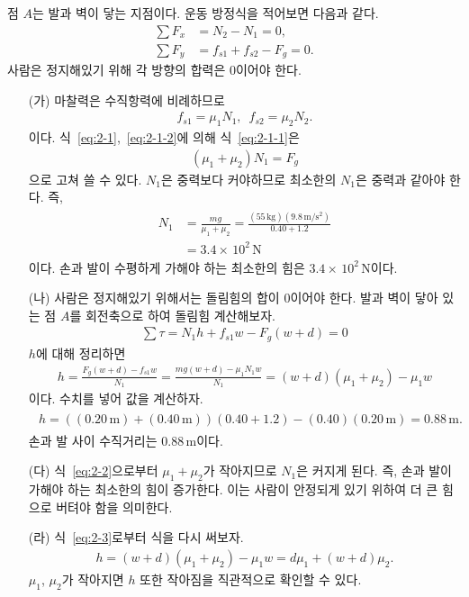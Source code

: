 \documentclass[floatfix,nofootinbib,superscriptaddress,fleqn]{revtex4-2}
\begin{document}
점 $A$는 발과 벽이 닿는 지점이다.
운동 방정식을 적어보면 다음과 같다.
\begin{align}
  \label{eq:2-1}\sum F_x &= N_{2}-N_{1} = 0,  \\
  \label{eq:2-1-1}\sum F_y &= f_{s1}+f_{s2}-F_g = 0.
\end{align}
사람은 정지해있기 위해 각 방향의 합력은 $0$이어야 한다.
\begin{itemize}
  \item[(가)] 마찰력은 수직항력에 비례하므로
  \begin{align}\label{eq:2-1-2}
    f_{s1} = \mu_1N_1,\,\,\,
    f_{s2} = \mu_2N_2.
  \end{align}
  이다. 식~\eqref{eq:2-1},~\eqref{eq:2-1-2}에 의해 
  식~\eqref{eq:2-1-1}은
  \begin{align}
    (\mu_1+\mu_2)N_1 =F_g
  \end{align}
  으로 고쳐 쓸 수 있다.
  $N_1$은 중력보다 커야하므로 최소한의 $N_1$은 중력과 같아야 한다. 즉,
  \begin{align}\label{eq:2-2}
    \begin{split}
      N_1 &= \frac{mg}{\mu_1+\mu_2}
      = \frac{(55\,\mathrm{kg})(9.8\,\mathrm{m/s^2})}{0.40+1.2} \\
      &= 3.4\times\,10^2\,\mathrm{N}
    \end{split}
  \end{align}
  이다. 손과 발이 수평하게 가해야 하는 최소한의 힘은 
  $3.4\times\,10^2\,\mathrm{N}$이다.
  \item[(나)] 
  사람은 정지해있기 위해서는 돌림힘의 합이 $0$이어야 한다. 
  발과 벽이 닿아 있는 점 $A$를 회전축으로 하여
  돌림힘 계산해보자.
  \begin{align}
    \sum \tau = N_1 h + f_{s1} w - F_g(w+d) = 0
  \end{align}
  $h$에 대해 정리하면
  \begin{align}\label{eq:2-3}
    h = \frac{F_g(w+d)-f_{s1} w}{N_1}
    =\frac{mg(w+d)-\mu_1N_1 w}{N_1}
    =(w+d)(\mu_1+\mu_2) - \mu_1 w
  \end{align}
  이다. 수치를 넣어 값을 계산하자.
  \begin{align}
    \begin{split}
      h=((0.20\,\mathrm{m})+(0.40\,\mathrm{m}))(0.40+1.2) 
      - (0.40)(0.20\,\mathrm{m})
      =0.88\,\mathrm{m}.
    \end{split}
  \end{align}
  손과 발 사이 수직거리는 $0.88\,\mathrm{m}$이다.
  \item[(다)]
  식~\eqref{eq:2-2}으로부터 $\mu_1+\mu_2$가 작아지므로 
  $N_1$은 커지게 된다. 즉, 손과 발이 가해야 하는 최소한의 힘이 증가한다.
  이는 사람이 안정되게 있기 위하여 더 큰 힘으로 버텨야 함을 의미한다.
  \item[(라)]
  식~\eqref{eq:2-3}로부터 식을 다시 써보자.
  \begin{align}
    h=(w+d)(\mu_1+\mu_2) - \mu_1 w
    =d\mu_1 + (w+d)\mu_2.
  \end{align}
  $\mu_1$, $\mu_2$가 작아지면 $h$ 또한 작아짐을 직관적으로 확인할 수 있다.
\end{itemize}
\end{document}
